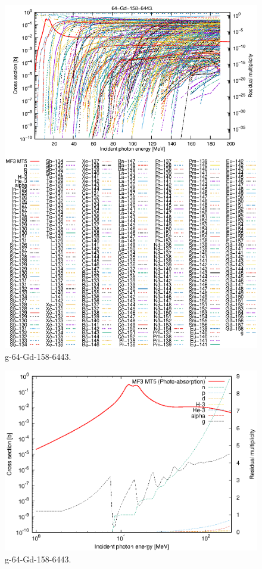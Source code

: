 \begin{figure}
 \includegraphics[width=\linewidth]{eps/g_64-Gd-158_6443.eps}
  \caption{g-64-Gd-158-6443.}
\end{figure}
\newpage \clearpage

\begin{figure}
 \includegraphics[width=\linewidth]{eps-log/g_64-Gd-158_6443.eps}
 \caption{g-64-Gd-158-6443.}
\end{figure}
\newpage \clearpage

